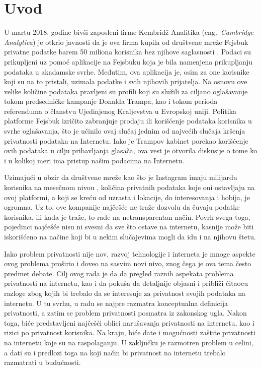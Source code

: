 \documentclass[a4paper]{article}
\begin{document}
\section{Uvod}
\label{sec:uvod}
\par U martu 2018. godine bivši zaposleni firme Kembridž Analitika (eng.~{\em Cambridge Analytica}) je otkrio javnosti da je ova firma kupila od društvene mreže Fejsbuk privatne podatke barem 50 miliona korisnika bez njihove saglasnosti \cite{guardian}. Podaci su prikupljeni uz pomoć aplikacije na Fejsbuku koja je bila namenjena prikupljanju podataka u akadamske svrhe. Međutim, ova aplikacija je, osim za one korisnike koji su na to pristali, uzimala podatke i svih njihovih prijatelja. Na osnovu ove velike količine podataka pravljeni su profili koji su služili za ciljano oglašavanje tokom predsedničke kampanje Donalda Trampa, kao i tokom perioda referenduma o članstvu Ujedinjenog Kraljevstva u Evropskoj uniji. Politika platforme Fejsbuk izričito zabranjuje prodaju ili korišćenje podataka korisnika u svrhe oglašavanja, što je učinilo ovaj slučaj jednim od najvećih slučaja kršenja privatnosti podataka na Internetu. Iako je Trampov kabinet porekao korišćenje ovih podataka u cilju pribavljanja glasača, ova vest je otvorila diskusije o tome ko i u kolikoj meri ima pristup našim podacima na Internetu.
\par Uzimajući u obzir da društvene mreže kao što je Instagram imaju milijardu korisnika na mesečnom nivou \cite{instagram}, količina privatnih podataka koje oni ostavljaju na ovoj platformi, a koji se kreću od uzrasta i lokacije, do interesovanja i hobija, je ogromna. Uz to, ove kompanije najčešće ne traže dozvolu da čuvaju podatke korisnika, ili kada je traže, to rade na netransparentan način. Povrh svega toga, pojedinci najčešće nisu ni svesni da sve što ostave na internetu, kasnije može biti iskorišćeno na načine koji bi u nekim slučajevima mogli da idu i na njihovu štetu.
\par Iako problem privatnosti nije nov, razvoj tehnologije i interneta je mnoge aspekte ovog problema proširio i doveo na sasvim novi nivo, znog čega je ova tema često predmet debate. Cilj ovog rada je da da pregled raznih aspekata problema privatnosti na internetu, kao i da pokuša da detaljnije objasni i približi čitaocu razloge zbog kojih bi trebalo da se interesuje za privatnost svojih podataka na internetu. U tu svrhu, u radu se najpre razmatra konceptualna definicija privatnosti, a zatim se problem privatnosti posmatra iz zakonskog ugla. Nakon toga, biće predstavljeni najčešći oblici narušavanja privatnosti na internetu, kao i rizici po privatnost korisnika. Na kraju, biće date i mogućnosti zaštite privatnosti na internetu koje su na raspolaganju. U zaključku je razmotren problem u celini, a dati su i predlozi toga na koji način bi privatnost na internetu trebalo razmatrati u budućnosti.
\end{document}
